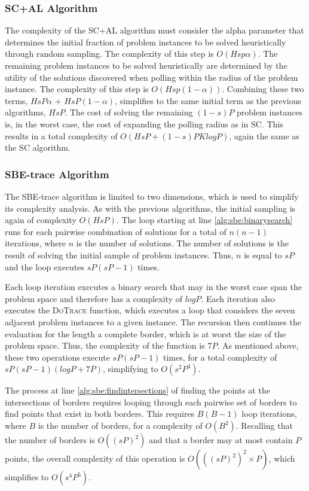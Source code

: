 \subsubsection{SC+AL Algorithm} The complexity of the SC+AL algorithm must consider the alpha parameter that determines the initial fraction of problem instances  to be solved heuristically through random sampling.  The complexity of this step is $O(Hsp\alpha)$.  The remaining problem instances to be solved heuristically are determined by the  utility of the solutions discovered when polling within the radius of the problem instance.  The complexity of this step is $O(Hsp(1-\alpha))$.  Combining these two terms,  $HsP\alpha$ + $HsP(1-\alpha)$, simplifies to the same initial term as the previous algorithms, $HsP$.  The cost of solving the remaining $(1-s)P$ problem instances is, in the worst case, the cost of expanding the polling radius as in SC.  This results in a total complexity of $O(HsP + (1-s)PKlogP)$, again the same as the SC algorithm.

\subsubsection{SBE-trace Algorithm} The SBE-trace algorithm is limited to two dimensions, which is used to simplify its complexity analysis.  As with the previous algorithms, the initial sampling  is again of complexity $O(HsP)$.  The loop starting at line \ref{alg:sbe:binarysearch} runs for each pairwise combination of solutions for a total of $n(n-1)$ iterations, where $n$ is the number of solutions.  The number of solutions is the result of solving the initial sample of problem instances. Thus, $n$ is equal to $sP$ and the loop executes $sP(sP-1)$ times.

Each loop iteration executes a binary search that may in the worst case span the problem space and therefore has a complexity of $logP$.  Each iteration also executes the \textsc{DoTrace} function, which executes a loop that considers the seven adjacent problem instances to a given instance.  The recursion then continues the evaluation for the length a complete border, which is at worst the size of the problem space.  Thus, the complexity of the function is $7P$.  As mentioned above, these two operations execute $sP(sP-1)$ times, for a total complexity of $sP(sP-1)(logP + 7P)$, simplifying to $O(s^2P^3)$.

The process at line \ref{alg:sbe:findintersections} of finding the points at the intersections of borders requires looping through each pairwise set of borders to find points that exist in both borders.  This requires $B(B-1)$ loop iterations, where $B$ is the number of borders, for a complexity of $O(B^2)$.  Recalling that the number of borders is $O((sP)^2)$ and that a border may at most contain $P$ points, the overall complexity of this operation is $O(((sP)^2)^2 \times P)$, which simplifies to $O(s^4P^5)$.

